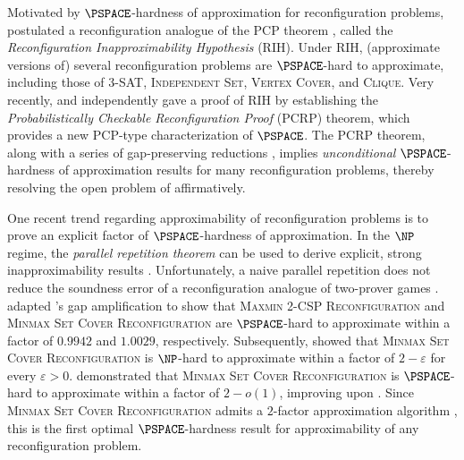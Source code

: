 \documentclass[11pt,fleqn]{article}
\renewcommand{\epsilon}{\varepsilon}
\newcommand{\prb}[1]{\textsc{#1}\xspace}
\theoremstyle{definition}
\numberwithin{equation}{section}
\begin{document}
Motivated by $\PSPACE$-hardness of approximation for reconfiguration problems,
\citet{ohsaka2023gap} postulated
a reconfiguration analogue of the PCP theorem \cite{arora1998probabilistic,arora1998proof},
called the \emph{Reconfiguration Inapproximability Hypothesis} (RIH).
Under RIH, (approximate versions of) several reconfiguration problems are $\PSPACE$-hard to approximate,
including those of 
\prb{3-SAT}, \prb{Independent Set}, \prb{Vertex Cover}, and \prb{Clique}.
Very recently,
\citet{hirahara2024probabilistically} and \citet{karthik2023inapproximability}
independently gave a proof of RIH
by establishing the \emph{Probabilistically Checkable Reconfiguration Proof} (PCRP) theorem,
which provides a new PCP-type characterization of $\PSPACE$.
The PCRP theorem, along with a series of gap-preserving reductions 
\cite{ohsaka2023gap,ohsaka2024gap,hirahara2024probabilistically,hirahara2024optimal},
implies
\emph{unconditional} $\PSPACE$-hardness of approximation results for many reconfiguration problems,
thereby resolving the open problem of \cite{ito2011complexity} affirmatively. 

One recent trend regarding approximability of reconfiguration problems is to 
prove an explicit factor of $\PSPACE$-hardness of approximation.
In the $\NP$ regime,
the \emph{parallel repetition theorem} \cite{raz1998parallel} can be used to derive
explicit, strong inapproximability results
\cite{hastad1999clique,hastad2001some,feige1998threshold,bellare1998free,zuckerman2007linear}.
Unfortunately, a naive parallel repetition does not
reduce the soundness error of a reconfiguration analogue of two-prover games \cite{ohsaka2025approximate}.
\citet{ohsaka2024gap} adapted \citeauthor{dinur2007pcp}'s gap amplification \cite{dinur2007pcp,radhakrishnan2006gap,radhakrishnan2007dinurs}
to show that
\prb{Maxmin 2-CSP Reconfiguration} and \prb{Minmax Set Cover Reconfiguration} are 
$\PSPACE$-hard to approximate within a factor of $0.9942$ and $1.0029$, respectively.
Subsequently, \citet{karthik2023inapproximability} showed that
\prb{Minmax Set Cover Reconfiguration} is $\NP$-hard to approximate within
a factor of $2-\epsilon$ for every $\epsilon > 0$.
\citet{hirahara2024optimal} demonstrated that 
\prb{Minmax Set Cover Reconfiguration}
is $\PSPACE$-hard to approximate within a factor of $2-o(1)$,
improving upon \cite{karthik2023inapproximability,ohsaka2024gap}.
Since \prb{Minmax Set Cover Reconfiguration} admits
a $2$-factor approximation algorithm \cite{ito2011complexity},
this is the first optimal $\PSPACE$-hardness result for approximability of any reconfiguration problem.
\end{document}
